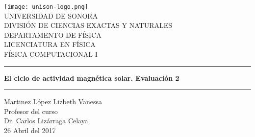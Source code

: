 \documentclass[12pt]{article}
\begin{document}
\begin{center}
\texttt{[image: unison-logo.png]}
\\
\vspace{0.5cm}
UNIVERSIDAD DE SONORA \\
\vspace{0.5cm}
DIVISIÓN DE CIENCIAS EXACTAS Y NATURALES \\
\vspace{0.5cm}
DEPARTAMENTO DE FÍSICA\\
\vspace{0.5cm}
LICENCIATURA EN FÍSICA\\
\vspace{0.5cm}
FÍSICA COMPUTACIONAL I

\vspace{2 cm}
\hrule
\vspace{1 cm}

{\huge \bfseries {El ciclo de actividad magnética solar. Evaluación 2}}

\vspace{1 cm}
\hrule
\vspace{2 cm}
Martinez López Lizbeth Vanessa \\ 
\vspace{1 cm}
Profesor del curso\\
Dr. Carlos Lizárraga Celaya\\
\vspace{2 cm}
26 Abril del 2017
\end{center}
\pagebreak
\end{document}
